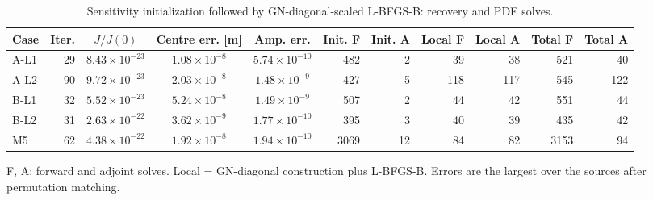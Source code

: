 \begin{table}[htbp]
\centering
\caption{Sensitivity initialization followed by GN-diagonal-scaled L-BFGS-B: recovery and PDE solves.}
\label{tab:table_reference}
\footnotesize
\begin{tabular}{lrcccrrrrrr}
\toprule
Case & Iter. & $J/J(0)$ & Centre err. [m] & Amp. err. & Init. F & Init. A & Local F & Local A & Total F & Total A \\
\midrule
A-L1 & 29 & $8.43\times 10^{-23}$ & $1.08\times 10^{-8}$ & $5.74\times 10^{-10}$ & 482 & 2 & 39 & 38 & 521 & 40 \\
A-L2 & 90 & $9.72\times 10^{-23}$ & $2.03\times 10^{-8}$ & $1.48\times 10^{-9}$ & 427 & 5 & 118 & 117 & 545 & 122 \\
B-L1 & 32 & $5.52\times 10^{-23}$ & $5.24\times 10^{-8}$ & $1.49\times 10^{-9}$ & 507 & 2 & 44 & 42 & 551 & 44 \\
B-L2 & 31 & $2.63\times 10^{-22}$ & $3.62\times 10^{-9}$ & $1.77\times 10^{-10}$ & 395 & 3 & 40 & 39 & 435 & 42 \\
M5 & 62 & $4.38\times 10^{-22}$ & $1.92\times 10^{-8}$ & $1.94\times 10^{-10}$ & 3069 & 12 & 84 & 82 & 3153 & 94 \\
\bottomrule
\end{tabular}
\par\smallskip
\parbox{0.92\linewidth}{\scriptsize F, A: forward and adjoint solves. Local = GN-diagonal construction plus L-BFGS-B. Errors are the largest over the sources after permutation matching.}
\end{table}
